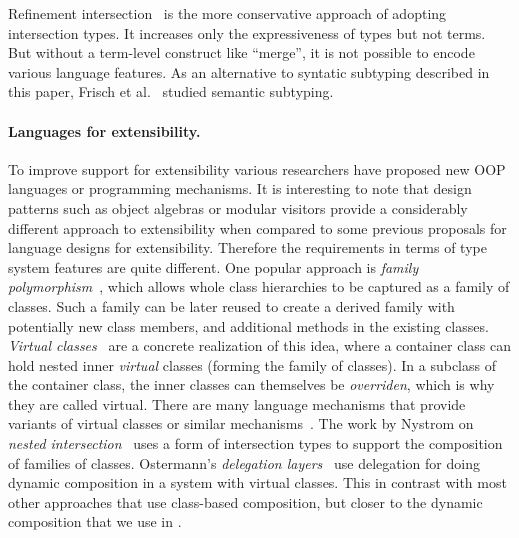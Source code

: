 Refinement
intersection~\cite{dunfield2007refined,davies2005practical,freeman1991refinement}
is the more conservative approach of adopting intersection types. It increases
only the expressiveness of types but not terms. But without a term-level
construct like ``merge'', it is not possible to encode various language
features. As an alternative to syntatic subtyping described in this paper,
Frisch et al.~\cite{frisch2008semantic} studied semantic subtyping.

\paragraph{Languages for extensibility.}
To improve support for extensibility various researchers have proposed
new OOP languages or programming mechanisms. It is interesting to
note that design patterns such as object algebras or modular visitors
provide a considerably different approach to extensibility when
compared to some previous proposals for language designs for
extensibility. Therefore the requirements in terms of type system
features are quite different.  One popular approach is \emph{family
  polymorphism}~\cite{Ernst01family}, which allows whole class hierarchies to be
captured as a family of classes. Such a family can be later reused to
create a derived family with potentially new class members, and
additional methods in the existing classes.  \emph{Virtual
  classes}~\cite{ernst2006virtual} are a concrete realization of this idea, where a
container class can hold nested inner \emph{virtual} classes (forming
the family of classes). In a subclass of the container class, the
inner classes can themselves be \emph{overriden}, which is why they
are called virtual. There are many language mechanisms that provide
variants of virtual classes or similar mechanisms~\cite{McDirmid01Jiazzi,Aracic06CaesarJ,Smaragdakis98mixin,nystrom2006j}. The work by
Nystrom on \emph{nested intersection}~\cite{nystrom2006j} uses a
form of intersection types to support the composition of
families of classes. Ostermann's \emph{delegation layers}~\cite{Ostermann02dynamically}
use delegation for doing dynamic composition in a system
with virtual classes. This in contrast with most other approaches
that use class-based composition, but closer to the dynamic
composition that we use in \name.
\begin{comment}
In contrast to type systems for virtual classes
and similar mechanisms, the goal of our work is to study the type
systems and basic language mechanism to better support such design patterns.
 some researchers have designed new type
system features such as virtual classes~\cite{ernst2006virtual}, polymorphic
variants~\cite{garrigue1998programming}, while others have shown employing
programming pattern such as object algebras~\cite{oliveira2012extensibility} by
using features within existing programming languages. Both of the two approaches
have drawbacks of some kind. The first approach often involves heavyweight
designs, while the second approach still sacrifices the readability for
extensibility.
\bruno{fill me in with more details and more references!}
\end{comment}

